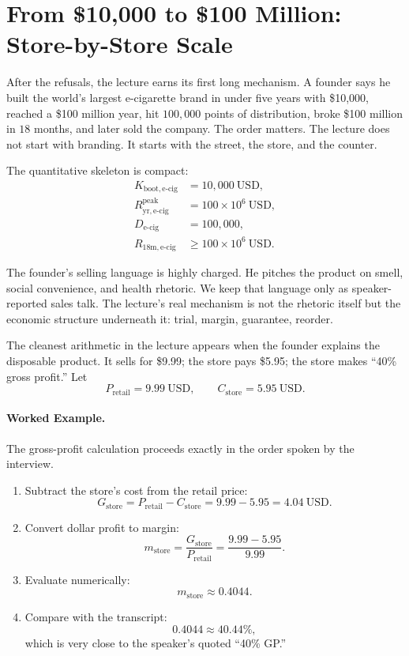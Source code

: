 \section{From \$10{,}000 to \$100 Million: Store-by-Store Scale}

After the refusals, the lecture earns its first long mechanism. A founder says he built the world's largest e-cigarette brand in under five years with \$10{,}000, reached a \$100 million year, hit \(100{,}000\) points of distribution, broke \$100 million in \(18\) months, and later sold the company. The order matters. The lecture does not start with branding. It starts with the street, the store, and the counter.

The quantitative skeleton is compact:
\begin{align}
K_{\mathrm{boot,e\mbox{-}cig}} &= 10{,}000\ \mathrm{USD},\\
R_{\mathrm{yr},\mathrm{e\mbox{-}cig}}^{\mathrm{peak}} &= 100\times 10^{6}\ \mathrm{USD},\\
D_{\mathrm{e\mbox{-}cig}} &= 100{,}000,\\
R_{18\mathrm{m},\mathrm{e\mbox{-}cig}} &\ge 100\times 10^{6}\ \mathrm{USD}.
\end{align}

The founder's selling language is highly charged. He pitches the product on smell, social convenience, and health rhetoric. We keep that language only as speaker-reported sales talk. The lecture's real mechanism is not the rhetoric itself but the economic structure underneath it: trial, margin, guarantee, reorder.

The cleanest arithmetic in the lecture appears when the founder explains the disposable product. It sells for \$9.99; the store pays \$5.95; the store makes ``40\% gross profit.'' Let
\[
P_{\mathrm{retail}}=9.99\ \mathrm{USD},\qquad C_{\mathrm{store}}=5.95\ \mathrm{USD}.
\]

\paragraph{Worked Example.} The gross-profit calculation proceeds exactly in the order spoken by the interview.
\begin{enumerate}
\item Subtract the store's cost from the retail price:
\[
G_{\mathrm{store}}=P_{\mathrm{retail}}-C_{\mathrm{store}}=9.99-5.95=4.04\ \mathrm{USD}.
\]
\item Convert dollar profit to margin:
\[
m_{\mathrm{store}}=\frac{G_{\mathrm{store}}}{P_{\mathrm{retail}}}
=\frac{9.99-5.95}{9.99}.
\]
\item Evaluate numerically:
\[
m_{\mathrm{store}}\approx 0.4044.
\]
\item Compare with the transcript:
\[
0.4044 \approx 40.44\%,
\]
which is very close to the speaker's quoted ``40\% GP.''
\end{enumerate}


